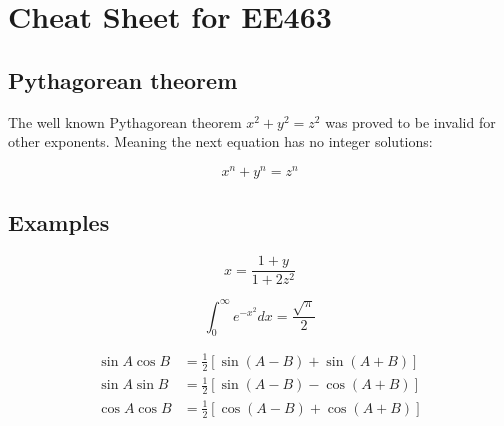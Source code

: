 \documentclass[twocolumn]{article}
\begin{document}
\section{Cheat Sheet for EE463}

\subsection{ Pythagorean theorem}

The well known Pythagorean theorem \(x^2 + y^2 = z^2\) was 
proved to be invalid for other exponents. 
Meaning the next equation has no integer solutions:
 
$$ x^n + y^n = z^n $$

\subsection{ Examples}

$$x=\frac{1+y}{1+2z^2}$$

$$\int_0^\infty e^{-x^2} dx=\frac{\sqrt{\pi}}{2}$$

\begin{align*}
          \sin A \cos B &= \frac{1}{2}\left[ \sin(A-B)+\sin(A+B) \right] \\
          \sin A \sin B &= \frac{1}{2}\left[ \sin(A-B)-\cos(A+B) \right] \\
          \cos A \cos B &= \frac{1}{2}\left[ \cos(A-B)+\cos(A+B) \right] \\
\end{align*}
\end{document}
